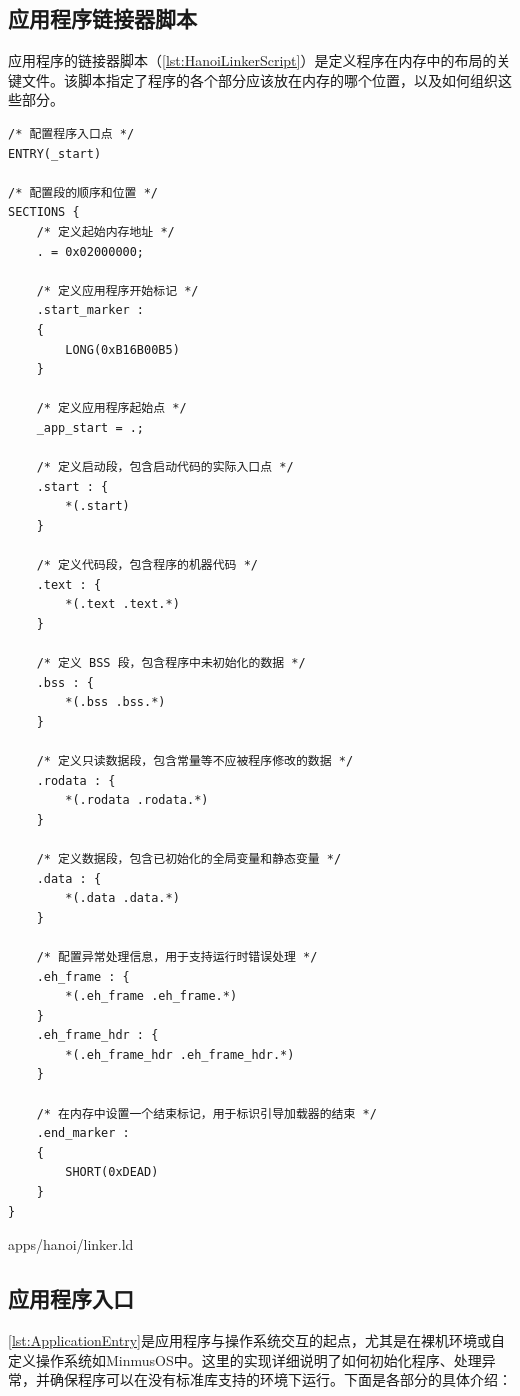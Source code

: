 \subsection{应用程序链接器脚本}

应用程序的链接器脚本（\cref{lst:HanoiLinkerScript}）是定义程序在内存中的布局的关键文件。该脚本指定了程序的各个部分应该放在内存的哪个位置，以及如何组织这些部分。

\begin{listing}[htbp]
    \begin{verbatim}
/* 配置程序入口点 */
ENTRY(_start)

/* 配置段的顺序和位置 */
SECTIONS {
    /* 定义起始内存地址 */
    . = 0x02000000;

    /* 定义应用程序开始标记 */
    .start_marker :
    {
        LONG(0xB16B00B5)
    }

    /* 定义应用程序起始点 */
    _app_start = .;

    /* 定义启动段，包含启动代码的实际入口点 */
    .start : {
        *(.start)
    }

    /* 定义代码段，包含程序的机器代码 */
    .text : {
        *(.text .text.*)
    }

    /* 定义 BSS 段，包含程序中未初始化的数据 */
    .bss : {
        *(.bss .bss.*)
    }

    /* 定义只读数据段，包含常量等不应被程序修改的数据 */
    .rodata : {
        *(.rodata .rodata.*)
    }

    /* 定义数据段，包含已初始化的全局变量和静态变量 */
    .data : {
        *(.data .data.*)
    }

    /* 配置异常处理信息，用于支持运行时错误处理 */
    .eh_frame : {
        *(.eh_frame .eh_frame.*)
    }
    .eh_frame_hdr : {
        *(.eh_frame_hdr .eh_frame_hdr.*)
    }

    /* 在内存中设置一个结束标记，用于标识引导加载器的结束 */
    .end_marker :
    {
        SHORT(0xDEAD)
    }
}
    \end{verbatim}
    \caption{apps/hanoi/linker.ld}\label{lst:HanoiLinkerScript}
\end{listing}

\subsection{应用程序入口}

\cref{lst:ApplicationEntry}是应用程序与操作系统交互的起点，尤其是在裸机环境或自定义操作系统如MinmusOS中。这里的实现详细说明了如何初始化程序、处理异常，并确保程序可以在没有标准库支持的环境下运行。下面是各部分的具体介绍：


